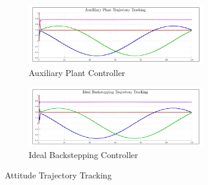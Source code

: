 \begin{figure}[hbtp]\ContinuedFloat
\vspace{-6pt}
\begin{subfigure}{\textwidth}
\centering
\includegraphics[width=0.85\textwidth]{graphs/XPD_Trajectory}
\vspace{-6pt}
\caption{Auxiliary Plant Controller}
\end{subfigure}
\vspace{-6pt}
\begin{subfigure}{\textwidth}
\centering
\includegraphics[width=0.85\textwidth]{graphs/IBC_Trajectory}
\vspace{-6pt}
\caption{Ideal Backstepping Controller}
\label{fig:attitude-trajectory-ibc-tracking}
\end{subfigure}
\caption{Attitude Trajectory Tracking}
\label{fig:attitude-trajectory-tracking}
\vspace{-20pt}
\end{figure}
\par
\hspace{2pt}\vspace{20pt}
\par
